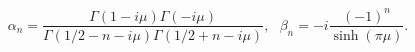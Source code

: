 \begin{equation}
\alpha_n= \frac{\Gamma(1-i\mu)\Gamma(-i\mu)}{\Gamma(1/2-n-i\mu)\Gamma(1/2+n-i\mu)} , \ \ \ \beta_n=-i \frac{(-1)^n}{\sinh(\pi \mu)} .
\end{equation}

